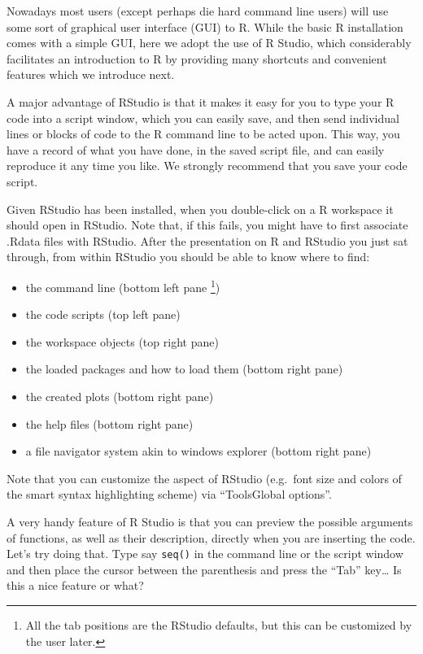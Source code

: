\documentclass[
]{article}
\providecommand{\tightlist}{%
  \setlength{\itemsep}{0pt}\setlength{\parskip}{0pt}}
\begin{document}
Nowadays most users (except perhaps die hard command line users) will
use some sort of graphical user interface (GUI) to R. While the basic R
installation comes with a simple GUI, here we adopt the use of R Studio,
which considerably facilitates an introduction to R by providing many
shortcuts and convenient features which we introduce next.

A major advantage of RStudio is that it makes it easy for you to type
your R code into a script window, which you can easily save, and then
send individual lines or blocks of code to the R command line to be
acted upon. This way, you have a record of what you have done, in the
saved script file, and can easily reproduce it any time you like. We
strongly recommend that you save your code script.

Given RStudio has been installed, when you double-click on a R workspace
it should open in RStudio. Note that, if this fails, you might have to
first associate .Rdata files with RStudio. After the presentation on R
and RStudio you just sat through, from within RStudio you should be able
to know where to find:

\begin{itemize}
\tightlist
\item
  the command line (bottom left pane
  \footnote{All the tab positions are the RStudio defaults, but this can be customized by the user later.})
\item
  the code scripts (top left pane)
\item
  the workspace objects (top right pane)
\item
  the loaded packages and how to load them (bottom right pane)
\item
  the created plots (bottom right pane)
\item
  the help files (bottom right pane)
\item
  a file navigator system akin to windows explorer (bottom right pane)
\end{itemize}

Note that you can customize the aspect of RStudio (e.g.~font size and
colors of the smart syntax highlighting scheme) via
``Tools\textbar Global options''.

A very handy feature of R Studio is that you can preview the possible
arguments of functions, as well as their description, directly when you
are inserting the code. Let's try doing that. Type say \texttt{seq()} in
the command line or the script window and then place the cursor between
the parenthesis and press the ``Tab'' key\ldots{} Is this a nice feature
or what?
\end{document}
